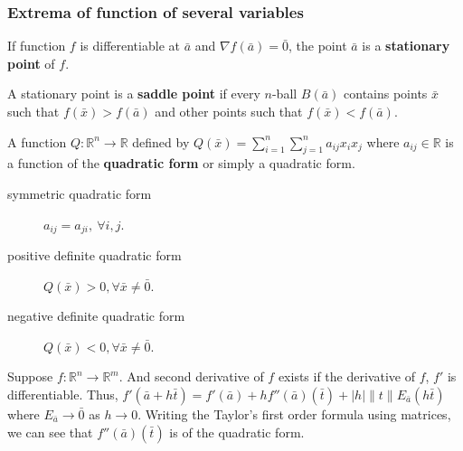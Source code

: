\subsubsection{Extrema of function of several variables}
\begin{definition}
	If function $f$ is differentiable at $\bar{a}$ and $\nabla f(\bar{a}) = \bar{0}$, the point $\bar{a}$ is a \textbf{stationary point} of $f$.
\end{definition}

\begin{definition}
	A stationary point is a \textbf{saddle point} if every $n$-ball $B(\bar{a})$ contains points $\bar{x}$ such that $f(\bar{x}) > f(\bar{a})$ and other points such that $f(\bar{x}) < f(\bar{a})$.
\end{definition}

\begin{definition}
	A function $Q : \mathbb{R}^n \to \mathbb{R}$ defined by $Q(\bar{x}) = \sum\limits_{i=1}^n \sum\limits_{j=1}^n a_{ij}x_ix_j$
	where $a_{ij} \in \mathbb{R}$ is a function of the \textbf{quadratic form} or simply a quadratic form.
\begin{description}
	\item[symmetric quadratic form] $a_{ij} = a_{ji},\ \forall i,j$. 
	\item[positive definite quadratic form] $Q(\bar{x}) > 0, \forall \bar{x} \ne \bar{0}$. 
	\item[negative definite quadratic form] $Q(\bar{x}) < 0, \forall \bar{x} \ne \bar{0}$. 
\end{description}
\end{definition}

\begin{commentary}
	Suppose $f : \mathbb{R}^n \to \mathbb{R}^m$.
	And second derivative of $f$ exists if the derivative of $f$, $f'$ is differentiable.
	Thus, $f'(\bar{a}+h\bar{t}) = f'(\bar{a}) + h f''(\bar{a})(\bar{t}) + |h| \|t\| E_{\bar{a}}(h\bar{t})$ where $E_{\bar{a}} \to \bar{0}$ as $h \to 0$.
	Writing the Taylor's first order formula using matrices, we can see that $f''(\bar{a})(\bar{t})$ is of the quadratic form.
\end{commentary}

